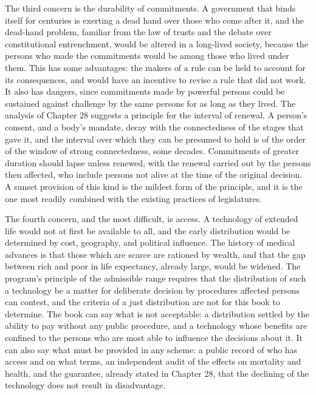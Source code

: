 The third concern is the durability of commitments. A government that binds itself for centuries is exerting a dead hand over those who come after it, and the dead-hand problem, familiar from the law of trusts and the debate over constitutional entrenchment, would be altered in a long-lived society, because the persons who made the commitments would be among those who lived under them. This has some advantages: the makers of a rule can be held to account for its consequences, and would have an incentive to revise a rule that did not work. It also has dangers, since commitments made by powerful persons could be sustained against challenge by the same persons for as long as they lived. The analysis of Chapter 28 suggests a principle for the interval of renewal. A person's consent, and a body's mandate, decay with the connectedness of the stages that gave it, and the interval over which they can be presumed to hold is of the order of the window of strong connectedness, some decades. Commitments of greater duration should lapse unless renewed, with the renewal carried out by the persons then affected, who include persons not alive at the time of the original decision. A sunset provision of this kind is the mildest form of the principle, and it is the one most readily combined with the existing practices of legislatures.

The fourth concern, and the most difficult, is access. A technology of extended life would not at first be available to all, and the early distribution would be determined by cost, geography, and political influence. The history of medical advances is that those which are scarce are rationed by wealth, and that the gap between rich and poor in life expectancy, already large, would be widened. The program's principle of the admissible range requires that the distribution of such a technology be a matter for deliberate decision by procedures affected persons can contest, and the criteria of a just distribution are not for this book to determine. The book can say what is not acceptable: a distribution settled by the ability to pay without any public procedure, and a technology whose benefits are confined to the persons who are most able to influence the decisions about it. It can also say what must be provided in any scheme: a public record of who has access and on what terms, an independent audit of the effects on mortality and health, and the guarantee, already stated in Chapter 28, that the declining of the technology does not result in disadvantage.

